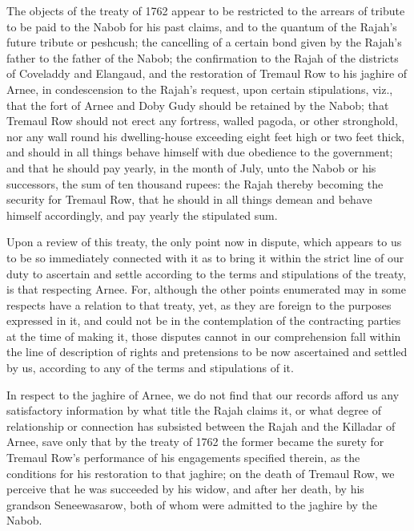 The objects of the treaty of 1762 appear to be restricted to the arrears of tribute to be paid to the Nabob for his past claims, and to the quantum of the Rajah's future tribute or peshcush; the cancelling of a certain bond given by the Rajah's father to the father of the Nabob; the confirmation to the Rajah of the districts of Coveladdy and Elangaud, and the restoration of Tremaul Row to his jaghire of Arnee, in condescension to the Rajah's request, upon certain stipulations, viz., that the fort of Arnee and Doby Gudy should be retained by the Nabob; that Tremaul Row should not erect any fortress, walled pagoda, or other stronghold, nor any wall round his dwelling-house exceeding eight feet high or two feet thick, and should in all things behave himself with due obedience to the government; and that he should pay yearly, in the month of July, unto the Nabob or his successors, the sum of ten thousand rupees: the Rajah thereby becoming the security for Tremaul Row, that he should in all things demean and behave himself accordingly, and pay yearly the stipulated sum.

Upon a review of this treaty, the only point now in dispute, which appears to us to be so immediately connected with it as to bring it within the strict line of our duty to ascertain and settle according to the terms and stipulations of the treaty, is that respecting Arnee. For, although the other points enumerated may in some respects have a relation to that treaty, yet, as they are foreign to the purposes expressed in it, and could not be in the contemplation of the contracting parties at the time of making it, those disputes cannot in our comprehension fall within the line of description of rights and pretensions to be now ascertained and settled by us, according to any of the terms and stipulations of it.

In respect to the jaghire of Arnee, we do not find that our records afford us any satisfactory information by what title the Rajah claims it, or what degree of relationship or connection has subsisted between the Rajah and the Killadar of Arnee, save only that by the treaty of 1762 the former became the surety for Tremaul Row's performance of his engagements specified therein, as the conditions for his restoration to that jaghire; on the death of Tremaul Row, we perceive that he was succeeded by his widow, and after her death, by his grandson Seneewasarow, both of whom were admitted to the jaghire by the Nabob.

